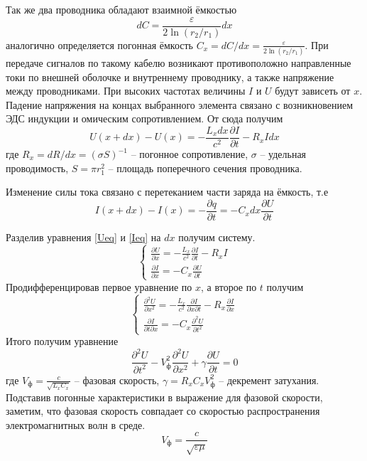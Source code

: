\documentclass[a4paper,12pt]{article}
\theoremstyle{definition}
\begin{document}
	Так же два проводника обладают взаимной ёмкостью
	\begin{equation}
		dC=\frac{\varepsilon}{2\ln(r_2/r_1)}dx
	\end{equation}
	аналогично определяется погонная ёмкость $C_x=dC/dx=\frac{\varepsilon}{2\ln(r_2/r_1)}$. При передаче сигналов по такому кабелю возникают противоположно направленные токи по внешней оболочке и внутреннему проводнику, а также напряжение между проводниками. При высоких частотах величины $I$ и $U$ будут зависеть от $x$.
	Падение напряжения на концах выбранного элемента связано с возникновением ЭДС индукции и омическим сопротивлением. От сюда получим
	\begin{equation}\label{Ueq}
		U(x+dx)-U(x)=-\frac{L_xdx}{c^2}\frac{\partial I}{\partial t}-R_xIdx     
	\end{equation}
 	где $R_x= dR/dx= (\sigma S)^{-1}$ -- погонное сопротивление, $\sigma$ -- удельная проводимость, $S=\pi r_1^2$ -- площадь поперечного сечения проводника.
 	
 	Изменение силы тока связано с перетеканием части заряда на ёмкость, т.е
 	\begin{equation}\label{Ieq}
 		I(x+dx)-I(x)=-\frac{\partial q}{\partial t}=-C_x dx \frac{\partial U}{\partial t}
 	\end{equation}
 	
 	Разделив уравнения \eqref{Ueq} и \eqref{Ieq} на $dx$ получим систему.
 	\begin{equation}
 		\begin{cases}
 			\frac{\partial U}{\partial x}=-\frac{L_x}{c^2}\frac{\partial I}{\partial t}-R_xI
 			\\
 			\frac{\partial I}{\partial x}=-C_x\frac{\partial U}{\partial t}
 		\end{cases}
 	\end{equation}
 	Продифференцировав первое уравнение по $x$, а второе по $t$ получим
\begin{equation}\label{WaveSystUeq}
 		\begin{cases}
 			\frac{\partial^2 U}{\partial x^2}=-\frac{L_x}{c^2}\frac{\partial I}{\partial x\partial t}-R_x\frac{\partial I}{\partial x}
 			\\
 			\frac{\partial I}{\partial t\partial x}=-C_x\frac{\partial^2 U}{\partial t^2}
 		\end{cases}
\end{equation}
 	Итого получим уравнение
\begin{equation}\label{WaveUeq}
 		\frac{\partial^2 U}{\partial t^2}-V^2_\text{ф}\frac{\partial^2 U}{\partial x^2}+\gamma\frac{\partial U}{\partial t}=0
\end{equation}
 	где $V_\text{ф}=\frac{c}{\sqrt{L_xC_x}}$ -- фазовая скорость, $\gamma=R_xC_xV^2_\text{ф}$ -- декремент затухания. Подставив погонные характеристики в выражение для фазовой скорости, заметим, что фазовая скорость совпадает со скоростью распространения электромагнитных волн в среде.
 	\begin{equation}
 		V_\text{ф}=\frac{c}{\sqrt{\varepsilon\mu}}
 	\end{equation}
 	
\end{document}

